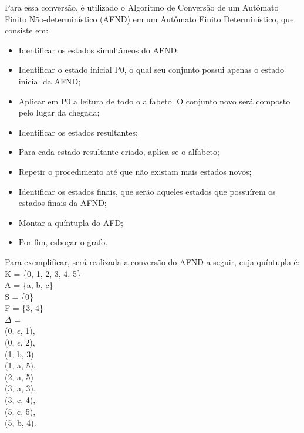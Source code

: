 \documentclass[a4paper,10pt]{article} %
\begin{document}
Para essa conversão, é utilizado o Algoritmo de Conversão de um Autômato Finito Não-determinístico (AFND) em um Autômato Finito Determinístico, que consiste em:
    \begin{itemize}
        \item Identificar os estados simultâneos do AFND;
        \item Identificar o estado inicial P0, o qual seu conjunto possui apenas o estado inicial da AFND;
        \item Aplicar em P0 a leitura de todo o alfabeto. O conjunto novo será composto pelo lugar da chegada;
        \item Identificar os estados resultantes;
        \item Para cada estado resultante criado, aplica-se o alfabeto;
        \item Repetir o procedimento até que não existam mais estados novos;
        \item Identificar os estados finais, que serão aqueles estados que possuírem os estados finais da AFND;     
        \item Montar a quíntupla do AFD;     
        \item Por fim, esboçar o grafo.    
    \end{itemize}

Para exemplificar, será realizada a conversão do AFND a seguir, cuja quíntupla é:\\K = \{0, 1, 2, 3, 4, 5\}\\A = \{a, b, c\}\\S = \{0\}\\F = \{3, 4\}\\{$\Delta$} =\\(0, {$\epsilon$}, 1),\\(0, {$\epsilon$}, 2),\\(1, b, 3)\\(1, a, 5),\\(2, a, 5)\\(3, a, 3),\\(3, c, 4),\\(5, c, 5),\\(5, b, 4). \\
    \begin{center}
    \end{center}
\end{document}
